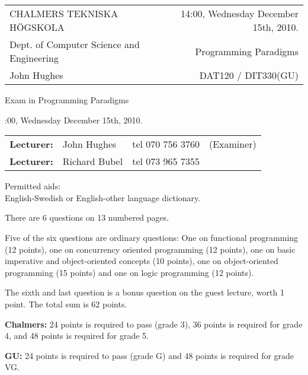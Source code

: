 \documentclass{article}
\begin{document}
\newcommand{\examtime}{14:00, Wednesday December 15th, 2010}
\newcommand{\points}[1]{\marginpar{\bf #1 points}}
\noindent
\begin{tabular}{lr}
CHALMERS TEKNISKA H\"OGSKOLA &\examtime{}.\\
Dept. of Computer Science and Engineering & Programming Paradigms\\
John Hughes                  & DAT120 / DIT330(GU) \\
\end{tabular}

\vspace{2.5cm} \noindent
\begin{center} {\LARGE
Exam in Programming Paradigms}
\end{center}

\vspace{1.5cm}

\noindent
\examtime{}.\\
\begin{tabular}{lllc}
\textbf{Lecturer:} &  John Hughes  & tel 070 756 3760 & (Examiner)\\
\textbf{Lecturer:} & Richard Bubel & tel 073 965 7355 & \\ 
\end{tabular}
\vspace{1cm}

\noindent
Permitted aids:\\
English-Swedish or English-other language dictionary.

There are 6 questions on 13 numbered pages. 

Five of the six questions are ordinary questions: One on functional
programming (12 points), one on concurrency oriented programming (12
points), one on basic imperative and object-oriented concepts (10
points), one on object-oriented programming (15 points) and one on
logic programming (12 points).

The sixth and last question is a bonus question on the guest lecture,
worth 1 point. The total sum is 62 points.


\textbf{Chalmers:}
24 points is required to pass (grade 3), 36 points is required for
grade 4, and 48 points is required for grade 5. 

\textbf{GU:}
24 points is required to pass (grade G) and 48 points is required for
grade VG.


\newpage 
\hfill\\
\newpage


\newpage
\end{document}
